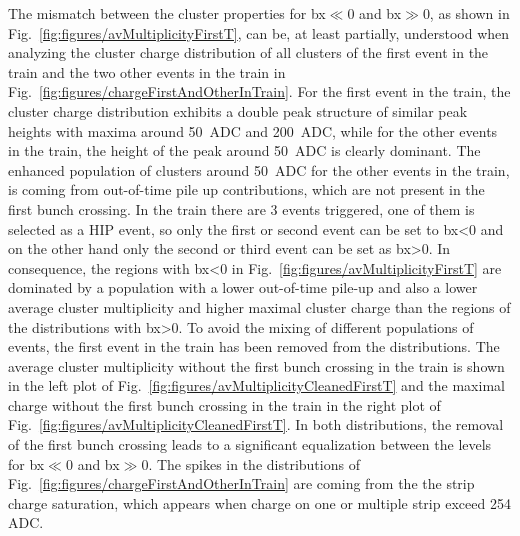 The mismatch between the cluster properties for bx$\ll$0 and bx$\gg$0, as shown in Fig.~\ref{fig:figures/avMultiplicityFirstT}, can be, at least partially, understood when analyzing the cluster charge distribution of all clusters of the first event in the train and the two other events in the train in Fig.~\ref{fig:figures/chargeFirstAndOtherInTrain}. For the first event in the train, the cluster charge distribution exhibits a double peak structure of similar peak heights with maxima around 50~ADC and 200~ADC, while for the other events in the train, the height of the peak around 50~ADC is clearly dominant. The enhanced population of clusters around 50~ADC for the other events in the train, is coming from out-of-time pile up contributions, which are not present in the first bunch crossing. In the train there are 3 events triggered, one of them is selected as a HIP event, so only the first or second event can be set to bx<0 and on the other hand only the second or third event can be set as bx>0. In consequence, the regions with bx<0 in Fig.~\ref{fig:figures/avMultiplicityFirstT} are dominated by a population with a lower out-of-time pile-up and also a lower average cluster multiplicity and higher maximal cluster charge than the regions of the distributions with bx>0. To avoid the mixing of different populations of events, the first event in the train has been removed from the distributions. The average cluster multiplicity without the first bunch crossing in the train is shown in the left plot of Fig.~\ref{fig:figures/avMultiplicityCleanedFirstT} and the maximal charge without the first bunch crossing in the train in the right plot of Fig.~\ref{fig:figures/avMultiplicityCleanedFirstT}. In both distributions, the removal of the first bunch crossing leads to a significant equalization between the levels for bx$\ll$0 and bx$\gg$0. The spikes in the distributions of Fig.~\ref{fig:figures/chargeFirstAndOtherInTrain} are coming from the the strip charge saturation, which appears when charge on one or multiple strip exceed 254 ADC.

